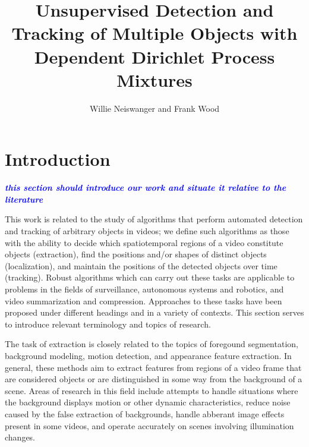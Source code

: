 \documentclass{article}
\newcommand{\frank}[1]{\textcolor{red}{\textsf{\emph{\textbf{\textcolor{blue}{#1}}}}}}
\begin{document}
\title{Unsupervised Detection and Tracking of Multiple Objects with Dependent Dirichlet Process Mixtures}
\author{Willie Neiswanger and Frank Wood}
\maketitle
\mbox{}




\section{Introduction}

\frank{this section should introduce our work and situate it relative to the literature}



This work is related to the study of algorithms that perform automated detection and tracking of arbitrary objects in videos; we define such algorithms as those with the ability to decide which spatiotemporal regions of a video constitute objects (extraction), find the positions and/or shapes of distinct objects (localization), and maintain the positions of the detected objects over time (tracking). Robust algorithms which can carry out these tasks are applicable to problems in the fields of surveillance, autonomous systems and robotics, and video summarization and compression. Approaches to these tasks have been proposed under different headings and in a variety of contexts. This section serves to introduce relevant terminology and topics of research.

The task of extraction is closely related to the topics of foregound segmentation, background modeling, motion detection, and appearance feature extraction. In general, these methods aim to extract features from regions of a video frame that are considered objects or are distinguished in some way from the background of a scene. Areas of research in this field include attempts to handle situations where the background displays motion or other dynamic characteristics, reduce noise caused by the false extraction of backgrounds, handle abberant image effects present in some videos, and operate accurately on scenes involving illumination changes.
\end{document}
